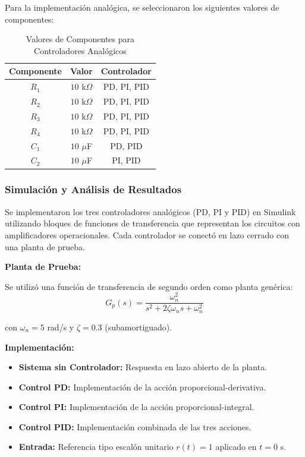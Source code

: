 \documentclass[conference]{IEEEtran}
\begin{document}
Para la implementación analógica, se seleccionaron los siguientes valores de componentes:

\begin{table}[htbp]
\centering
\caption{Valores de Componentes para Controladores Analógicos}
\begin{tabular}{ccc}
\toprule
\textbf{Componente} & \textbf{Valor} & \textbf{Controlador} \\
\midrule
$R_1$ & $10$ k$\Omega$ & PD, PI, PID \\
$R_2$ & $10$ k$\Omega$ & PD, PI, PID \\
$R_3$ & $10$ k$\Omega$ & PD, PI, PID \\
$R_4$ & $10$ k$\Omega$ & PD, PI, PID \\
$C_1$ & $10$ $\mu$F & PD, PID \\
$C_2$ & $10$ $\mu$F & PI, PID \\
\bottomrule
\end{tabular}
\end{table}

\subsubsection{Simulación y Análisis de Resultados}

Se implementaron los tres controladores analógicos (PD, PI y PID) en Simulink utilizando bloques de funciones de transferencia que representan los circuitos con amplificadores operacionales. Cada controlador se conectó en lazo cerrado con una planta de prueba.

\textbf{Planta de Prueba:}

Se utilizó una función de transferencia de segundo orden como planta genérica:
\begin{equation}
G_p(s) = \frac{\omega_n^2}{s^2 + 2\zeta\omega_ns + \omega_n^2}
\end{equation}

con $\omega_n = 5$ rad/s y $\zeta = 0.3$ (subamortiguado).

\textbf{Implementación:}
\begin{itemize}
\item \textbf{Sistema sin Controlador:} Respuesta en lazo abierto de la planta.
\item \textbf{Control PD:} Implementación de la acción proporcional-derivativa.
\item \textbf{Control PI:} Implementación de la acción proporcional-integral.
\item \textbf{Control PID:} Implementación combinada de las tres acciones.
\item \textbf{Entrada:} Referencia tipo escalón unitario $r(t) = 1$ aplicado en $t = 0$ s.
\end{itemize}
\end{document}

